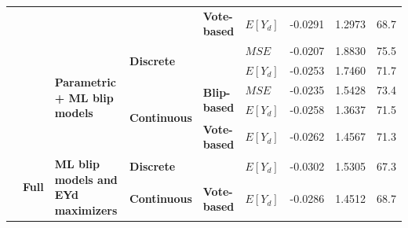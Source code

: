 \documentclass[a4paper,12pt]{article}
\begin{document}
\begin{table}[]
{\begin{tabular}{|l|l|l|l|l|l|l|l|l|}
                                &                                      &                                                              &                                      & \textbf{Vote-based}                  & \textbf{$E[Y_d]$} & -0.0291              & 1.2973                        & 68.7              \\ \cline{3-9} 
                                &                                      & \multirow{5}{*}{\textbf{Parametric + ML blip models}}        & \multicolumn{2}{l|}{\multirow{2}{*}{\textbf{Discrete}}}                     & \textbf{$MSE$}  & -0.0207              & 1.8830                        & 75.5              \\ \cline{6-9} 
                                &                                      &                                                              & \multicolumn{2}{l|}{}                                                       & \textbf{$E[Y_d]$} & -0.0253              & 1.7460                        & 71.7              \\ \cline{4-9} 
                                &                                      &                                                              & \multirow{3}{*}{\textbf{Continuous}} & \multirow{2}{*}{\textbf{Blip-based}} & \textbf{$MSE$}  & -0.0235              & 1.5428                        & 73.4              \\ \cline{6-9} 
                                &                                      &                                                              &                                      &                                      & \textbf{$E[Y_d]$} & -0.0258              & 1.3637                        & 71.5              \\ \cline{5-9} 
                                &                                      &                                                              &                                      & \textbf{Vote-based}                  & \textbf{$E[Y_d]$} & -0.0262              & 1.4567                        & 71.3              \\ \cline{2-9} 
                                & \multirow{4}{*}{\textbf{Full}}       & \multirow{2}{*}{\textbf{ML blip models and EYd maximizers}}  & \multicolumn{2}{l|}{\textbf{Discrete}}                                      & \textbf{$E[Y_d]$} & -0.0302              & 1.5305                        & 67.3              \\ \cline{4-9} 
                                &                                      &                                                              & \textbf{Continuous}                  & \textbf{Vote-based}                  & \textbf{$E[Y_d]$} & -0.0286              & 1.4512                        & 68.7              \\ \cline{3-9} 

\end{tabular}}
\end{table}
\end{document}
